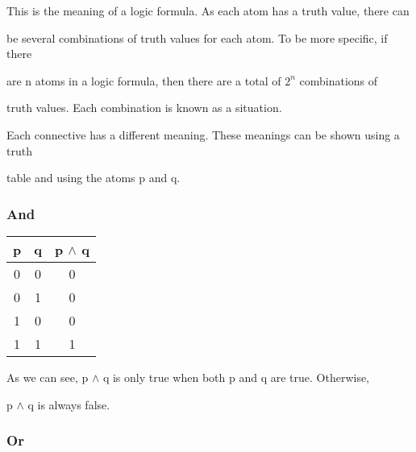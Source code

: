 \documentclass{report}
\begin{document}
This is the meaning of a logic formula. As each atom has a truth value, there can

be several combinations of truth values for each atom. To be more specific, if there

are n atoms in a logic formula, then there are a total of $2 ^ n$ combinations of

truth values. Each combination is known as a situation.



Each connective has a different meaning. These meanings can be shown using a truth

table and using the atoms p and q. 



\subsubsection{And}



\begin{center}

  \begin{tabular}{| c | c | c |}

    \hline

    p & q & p $\land$ q \\ \hline

    0 & 0 & 0 \\

    0 & 1 & 0 \\

    1 & 0 & 0 \\

    1 & 1 & 1 \\ \hline

  \end{tabular}

\end{center}



As we can see, p $\land$ q is only true when both p and q are true. Otherwise,

p $\land$ q is always false.



\subsubsection{Or}
\end{document}
